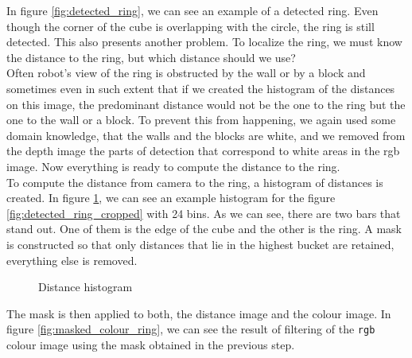 \documentclass[12pt,a4paper]{article}
\begin{document}
	In figure \ref{fig:detected_ring}, we can see an example of a detected ring. Even though the corner of the cube is overlapping with the circle, the ring is still detected. This also presents another problem. To localize the ring, we must know the distance to the ring, but which distance should we use? \\

	Often robot's view of the ring is obstructed by the wall or by a block and sometimes even in such extent that if we created the histogram of the distances on this image, the predominant distance would not be the one to the ring but the one to the wall or a block. To prevent this from happening, we again used some domain knowledge, that the walls and the blocks are white, and we removed from the depth image the parts of detection that correspond to white areas in the rgb image. Now everything is ready to compute the distance to the ring. \\
	
	To compute the distance from camera to the ring, a histogram of distances is created. In figure \ref{fig:distance_histogram}, we can see an example histogram for the figure \ref{fig:detected_ring_cropped} with 24 bins. As we can see, there are two bars that stand out. One of them is the edge of the cube and the other is the ring. A mask is constructed so that only distances that lie in the highest bucket are retained, everything else is removed. \\
	
	\begin{figure}[H]
		\centering
		\caption{Distance histogram}
		\label{fig:distance_histogram}
	\end{figure}

	The mask is then applied to both, the distance image and the colour image. In figure \ref{fig:masked_colour_ring}, we can see the result of filtering of the \texttt{rgb} colour image using the mask obtained in the previous step. \\
\end{document}
